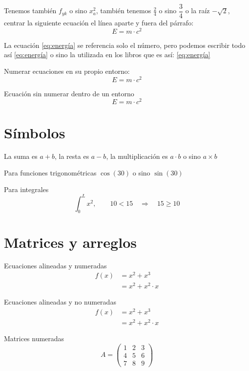 Tenemos también $ f_{yk} $ o sino $ x_{a}^{2} $, también tenemos $ \frac{2}{4} $ o sino $ \dfrac{3}{4} $ o la raíz $-\sqrt{2}$, centrar la siguiente ecuación el línea aparte y fuera del párrafo: $$E = m \cdot c^2 $$

La ecuación \ref{eq:energía} se referencia solo el número, pero podemos escribir todo así \autoref{eq:energía} o sino la utilizada en los libros que es así: \eqref{eq:energía}

Numerar ecuaciones en su propio entorno:
\begin{equation} \label{eq:energía}
	E = m \cdot c^2
\end{equation}

Ecuación sin numerar dentro de un entorno
\begin{equation*}
	E = m \cdot c^2
\end{equation*}


\section{Símbolos}
La suma es $ a + b $, la resta es $ a - b $, la multiplicación es $ a \cdot b$ o sino $ a \times b $

Para funciones trigonométricas $ \cos(30) $ o sino $ \sin(30) $

Para integrales $$ \int_0^L x^2, \quad \quad 10 < 15 \quad \Rightarrow \quad 15 \geq 10 $$ %

\section{Matrices y arreglos}

Ecuaciones alineadas y numeradas
\begin{align}
	f(x) & = x^2 + x^3 \\
	& = x^2 + x^2 \cdot x
\end{align}

Ecuaciones alineadas y no numeradas
\begin{align*}
	f(x) & = x^2 + x^3 \\
	& = x^2 + x^2 \cdot x
\end{align*}

Matrices numeradas
\begin{equation}
	A = 
	\begin{pmatrix}
		1 & 2 & 3 \\
		4 & 5 & 6 \\
		7 & 8 & 9
	\end{pmatrix}
\end{equation}

